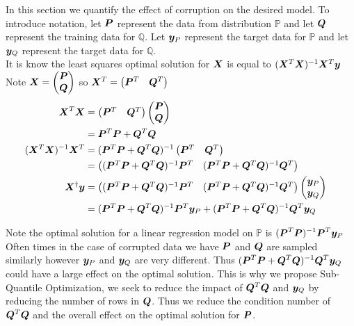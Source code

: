 \documentclass{article} %
\begin{document}
	In this section we quantify the effect of corruption on the desired model. To introduce notation, let ${\bm{P}}$ represent the data from distribution $\mathbb{P}$ and let ${\bm{Q}}$ represent the training data for $\mathbb{Q}$. Let ${\bm{y}}_P$ represent the target data for $\mathbb{P}$ and let ${\bm{y}}_Q$ represent the target data for $\mathbb{Q}$.\\
	It is know the least squares optimal solution for ${\bm{X}}$ is equal to $({\bm{X}}^T{\bm{X}})^{-1}{\bm{X}}^T{\bm{y}}$\\
	Note $\displaystyle {\bm{X}} = \begin{pmatrix}{\bm{P}} \\ {\bm{Q}} \end{pmatrix}$ so ${\bm{X}}^T = \begin{pmatrix}{\bm{P}}^T & {\bm{Q}}^T \end{pmatrix}$
	\begin{align}
		{\bm{X}}^T{\bm{X}} &= \begin{pmatrix}{\bm{P}}^T & {\bm{Q}}^T \end{pmatrix} \begin{pmatrix}{\bm{P}} \\ {\bm{Q}} \end{pmatrix} &&\\
		&= {\bm{P}}^T{\bm{P}} + {\bm{Q}}^T {\bm{Q}} &&\\
		({\bm{X}}^T{\bm{X}})^{-1}{\bm{X}}^T &= ({\bm{P}}^T{\bm{P}}+ {\bm{Q}}^T{\bm{Q}})^{-1}\begin{pmatrix}{\bm{P}}^T &{\bm{Q}}^T \end{pmatrix}&&\\
		&= \begin{pmatrix}({\bm{P}}^T{\bm{P}} + {\bm{Q}}^T{\bm{Q}})^{-1} {\bm{P}}^T & ({\bm{P}}^T{\bm{P}}  + {\bm{Q}}^T{\bm{Q}})^{-1} {\bm{Q}}^T \end{pmatrix} &&\\
		{\bm{X}}^{\dagger}{\bm{y}} &= \begin{pmatrix}({\bm{P}}^T{\bm{P}} + {\bm{Q}}^T{\bm{Q}})^{-1} {\bm{P}}^T & ({\bm{P}}^T{\bm{P}}  + {\bm{Q}}^T{\bm{Q}})^{-1} {\bm{Q}}^T \end{pmatrix} \begin{pmatrix}{\bm{y}}_P \\ {\bm{y}}_Q \end{pmatrix} &&\\
			&= ({\bm{P}}^T{\bm{P}} + {\bm{Q}}^T{\bm{Q}})^{-1} {\bm{P}}^T {\bm{y}}_P + ({\bm{P}}^T{\bm{P}} + {\bm{Q}}^T {\bm{Q}})^{-1} {\bm{Q}}^T {\bm{y}}_Q &&
	\end{align}

	Note the optimal solution for a linear regression model on $\mathbb{P}$ is $\displaystyle ({\bm{P}}^T{\bm{P}})^{-1}{\bm{P}}^T {\bm{y}}_P$\\
	Often times in the case of corrupted data we have ${\bm{P}}$ and ${\bm{Q}}$ are sampled similarly however ${\bm{y}}_P$ and ${\bm{y}}_Q$ are very different. Thus $\displaystyle ({\bm{P}}^T{\bm{P}} + {\bm{Q}}^T{\bm{Q}})^{-1}{\bm{Q}}^T{\bm{y}}_Q$ could have a large effect on the optimal solution. This is why we propose Sub-Quantile Optimization, we seek to reduce the impact of ${\bm{Q}}^T{\bm{Q}}$ and ${\bm{y}}_Q$ by reducing the number of rows in ${\bm{Q}}$. Thus we reduce the condition number of ${\bm{Q}}^T {\bm{Q}}$ and the overall effect on the optimal solution for ${\bm{P}}$.
	
\end{document}
